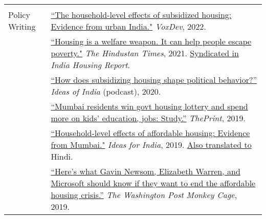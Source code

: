 \documentclass[letterpaper, 11pt]{article}
\begin{document}
\begin{longtable}{p{1in}p{5.5in}}
\\

& \\


Policy Writing & \href{https://voxdev.org/topic/infrastructure-urbanisation/household-level-effects-subsidised-housing-evidence-urban-india?utm_source=dlvr.it&utm_medium=twitter}{``The household-level effects of subsidized housing: Evidence from urban India."} \textit{VoxDev}, 2022.\\
& \href{https://www.hindustantimes.com/opinion/housing-is-a-welfare-weapon-it-can-help-people-escape-poverty-101629993983576.html}{``Housing is a welfare weapon. It can help people escape poverty."} \textit{The Hindustan Times}, 2021. \href{https://indiahousingreport.in/outputs/opinion/housing-is-a-welfare-weapon-it-can-help-people-escape-poverty/}{Syndicated in} \textit{India Housing Report}. \\ 

&   \href{https://www.discoursemagazine.com/politics/2020/12/24/ideas-of-india-how-does-subsidizing-housing-prices-shape-political-behavior}{``How does subsidizing housing shape political behavior?''} \textit{Ideas of India} (podcast), 2020.\\


& \href{https://theprint.in/opinion/mumbai-residents-win-govt-housing-lottery-and-spend-more-on-kids-education-jobs-study/290485/}{``Mumbai residents win govt housing lottery and spend more on kids' education, jobs: Study.''} \textit{ThePrint}, 2019. \\

&\href{https://www.ideasforindia.in/topics/poverty-inequality/household-level-effects-of-affordable-housing-evidence-from-mumbai.html}{``Household-level effects of affordable housing: Evidence from Mumbai."} \textit{Ideas for India}, 2019.  \href{https://www.ideasforindia.in/topics/poverty-inequality/household-level-effects-of-affordable-housing-evidence-from-mumbai-hindi.html}{Also translated to} Hindi.\\



& \href{https://www.washingtonpost.com/news/monkey-cage/wp/2019/01/31/heres-what-gavin-newsom-elizabeth-warren-and-microsoft-should-know-if-want-to-end-the-affordable-housing-crisis/?tid=sm_tw_cage}{``Here's what Gavin Newsom, Elizabeth Warren, and Microsoft should know if they want to end the affordable housing crisis.''} \textit{The Washington Post Monkey Cage}, 2019.\\




\end{longtable}
\end{document}

